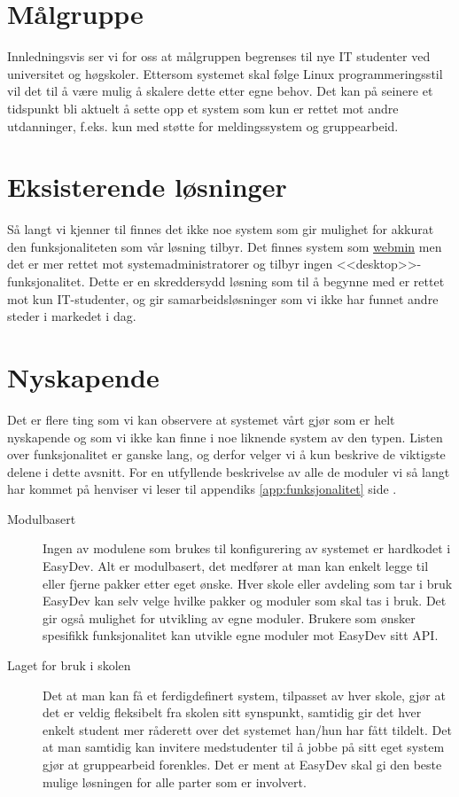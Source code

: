 \section{Målgruppe} \label{sec:målgruppe}
Innledningsvis ser vi for oss at målgruppen begrenses til nye IT studenter ved universitet og høgskoler. Ettersom systemet skal følge Linux programmeringsstil\cite{book:unixprog} vil det til å være mulig å skalere dette etter egne behov. Det kan på seinere et tidspunkt bli aktuelt å sette opp et system som kun er rettet mot andre utdanninger, f.eks. kun med støtte for meldingssystem og gruppearbeid.

\section{Eksisterende løsninger}
Så langt vi kjenner til finnes det ikke noe system som gir mulighet for akkurat den funksjonaliteten som vår løsning tilbyr. Det finnes system som \href{http://en.wikipedia.org/wiki/Webmin}{webmin} men det er mer rettet mot systemadministratorer og tilbyr ingen <<desktop>>-funksjonalitet. Dette er en skreddersydd løsning som til å begynne med er rettet mot kun IT-studenter, og gir samarbeidsløsninger som vi ikke har funnet andre steder i markedet i dag.

\section{Nyskapende}
Det er flere ting som vi kan observere at systemet vårt gjør som er helt nyskapende og som vi ikke kan finne i noe liknende system av den typen. Listen over funksjonalitet er ganske lang, og derfor velger vi å kun beskrive de viktigste delene i dette avsnitt. For en utfyllende beskrivelse av alle de moduler vi så langt har kommet på henviser vi leser til appendiks \ref{app:funksjonalitet} side \pageref{app:funksjonalitet}.


\begin{description}
\item[Modulbasert] Ingen av modulene som brukes til konfigurering av systemet er hardkodet i EasyDev. Alt er modulbasert, det medfører at man kan enkelt legge til eller fjerne pakker etter eget ønske. Hver skole eller avdeling som tar i bruk EasyDev kan selv velge hvilke pakker og moduler som skal tas i bruk. Det gir også mulighet for utvikling av egne moduler. Brukere som ønsker spesifikk funksjonalitet kan utvikle egne moduler mot EasyDev sitt API. 
\item[Laget for bruk i skolen] Det at man kan få et ferdigdefinert system, tilpasset av hver skole, gjør at det er veldig fleksibelt fra skolen sitt synspunkt, samtidig gir det hver enkelt student mer råderett over det systemet han/hun har fått tildelt. Det at man samtidig kan invitere medstudenter til å jobbe på sitt eget system gjør at gruppearbeid forenkles. Det er ment at EasyDev skal gi den beste mulige løsningen for alle parter som er involvert.
\end{description}